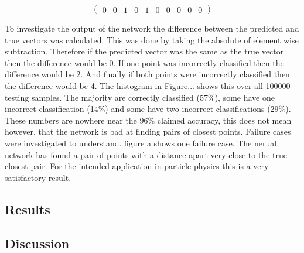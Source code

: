 \[
\begin{pmatrix}
0 & 0 & 1 & 0 & 1 & 0 & 0 & 0 & 0 & 0
\end{pmatrix}
\]

To investigate the output of the network the difference between the predicted and true vectors was calculated. This was done by taking the absolute of element wise subtraction. Therefore if the predicted vector was the same as the true vector then the difference would be 0. If one point was incorrectly classified then the difference would be 2. And finally if both points were incorrectly classified then the difference would be 4. The histogram in Figure... shows this over all 100000 testing samples. The majority are correctly classified (57\%), some have one incorrect classification (14\%) and some have two incorrect classifications (29\%). These numbers are nowhere near the 96\% claimed accuracy, this does not mean however, that the network is bad at finding pairs of closest points. Failure cases were investigated to understand. figure a shows one failure case. The nerual network has found a pair of points with a distance apart very close to the true closest pair. For the intended application in particle physics this is a very satisfactory result.


\subsection{Results}

\subsection{Discussion}


